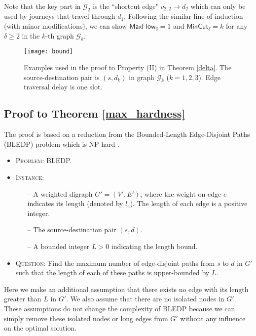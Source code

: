 \documentclass[10pt, conference, letterpaper]{IEEEtran}
\begin{document}
\vspace{1mm}

Note that the key part in $\mathcal{G}_2$ is the ``shortcut edge" $v_{2,2}\rightarrow d_2$ which can only be used by journeys that travel through $d_1$. Following the similar line of induction (with minor modifications), we can show  $\mathsf{MaxFlow_{\delta}}=1$ and $\mathsf{MinCut_{\delta}}=k$ for any $\delta\ge 2$ in the $k$-th graph $\mathcal{G}_k$.

\begin{figure}[ht]
\begin{center}
\texttt{[image: bound]}
\caption{Examples used in the proof to Property (II) in Theorem \ref{delta}. The source-destination pair is $(s,d_k)$ in graph $\mathcal{G}_k$ ($k=1,2,3$). Edge traversal delay is one slot.}
\label{bd}\vspace{-5mm}
\end{center}
\end{figure}
\subsection{Proof to Theorem \ref{max_hardness}} \label{proof_max_hardness}
The proof is based on a reduction from the Bounded-Length Edge-Disjoint Paths (BLEDP) problem which is NP-hard \cite{hard}.

\begin{itemize}

\item \textsc{Problem:} BLEDP.

\item \textsc{Instance:}
\begin{itemize}
\item [--] {A weighted digraph $G'=(V',E')$, where the weight on edge $e$ indicates its length (denoted by $l_e$). The length of each edge is a positive integer.}
\item [--] {The source-destination pair $(s,d)$.}
\item [--] {A bounded integer $L>0$ indicating the length bound.}
\end{itemize}

\item \textsc{Question:} Find the maximum number of edge-disjoint paths from $s$ to $d$ in $G'$ such that the length of each of these paths is upper-bounded by $L$.
\end{itemize}

Here we make an additional assumption that there exists no edge with its length greater than $L$ in $G'$. We also assume that there are no isolated nodes in $G'$. These assumptions do not change the complexity of BLEDP because we can simply remove these isolated nodes or long edges from $G'$ without any influence on the optimal solution.
\end{document}
